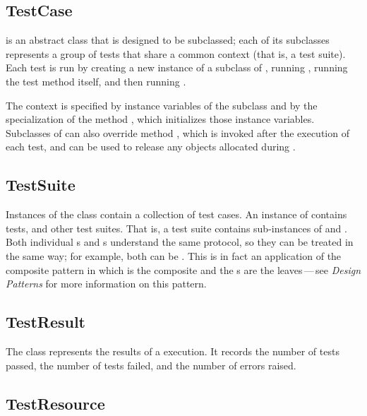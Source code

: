 \documentclass[a4paper,10pt,twoside]{book}
\begin{document}
\subsection{TestCase}

 is an abstract class that is designed to be subclassed; each of its subclasses represents a group of tests that share a common context (that is, a test suite).
Each test is run by creating a new instance of a subclass of ,
running , running the test method itself, and then running .

The context is specified
by instance variables of the subclass
and by the specialization of the method
, which initializes those instance variables.
Subclasses of  can also override method
, which is invoked after the execution of each test,
and can be used to release any objects
allocated during .
\subsection{TestSuite}

Instances of the class  contain a collection of test cases.  An
instance of  contains tests, and other test suites.
That is, a test suite contains sub-instances of
 and .
Both individual s and s understand the same protocol, so they can be treated in the same way; for example, both can be .
This is in fact an application of the composite
pattern in which  is the composite and the
s are the leaves\,---\,see \textit{Design Patterns} for more information on this pattern\cite{Gamm95a}.
\subsection{TestResult}

The class  represents the results of a
 execution.  It records the number of tests passed,
the number of tests failed, and the number of errors raised.

\subsection{TestResource}
\label{sec:resource}
\end{document}

